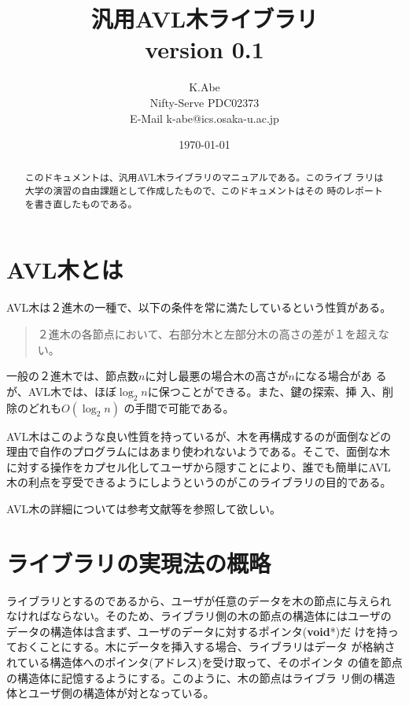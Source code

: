 ﻿
\title{汎用AVL木ライブラリ\\
{\normalsize version 0.1}
}
\author{K.Abe\\Nifty-Serve PDC02373\\E-Mail k-abe@ics.osaka-u.ac.jp}
\date{\today}
\sloppy


\maketitle
\begin{abstract}
このドキュメントは、汎用AVL木ライブラリのマニュアルである。このライブ
ラリは大学の演習の自由課題として作成したもので、このドキュメントはその
時のレポートを書き直したものである。
\end{abstract}

\section{AVL木とは}
AVL木は２進木の一種で、以下の条件を常に満たしているという性質がある。

\begin{quote}
２進木の各節点において、右部分木と左部分木の高さの差が１を超えない。
\end{quote}

一般の２進木では、節点数$n$に対し最悪の場合木の高さが$n$になる場合があ
るが、AVL木では、ほぼ$\log_2{n}$に保つことができる。また、鍵の探索、挿
入、削除のどれも$O(\log_2{n})$ の手間で可能である。

AVL木はこのような良い性質を持っているが、木を再構成するのが面倒などの
理由で自作のプログラムにはあまり使われないようである。そこで、面倒な木
に対する操作をカプセル化してユーザから隠すことにより、誰でも簡単にAVL
木の利点を亨受できるようにしようというのがこのライブラリの目的である。

AVL木の詳細については参考文献\cite{data-manage}等を参照して欲しい。

\section{ライブラリの実現法の概略}
ライブラリとするのであるから、ユーザが任意のデータを木の節点に与えられ
なければならない。そのため、ライブラリ側の木の節点の構造体にはユーザの
データの構造体は含まず、ユーザのデータに対するポインタ({\bf void}*)だ
けを持っておくことにする。木にデータを挿入する場合、ライブラリはデータ
が格納されている構造体へのポインタ(アドレス)を受け取って、そのポインタ
の値を節点の構造体に記憶するようにする。このように、木の節点はライブラ
リ側の構造体とユーザ側の構造体が対となっている。

